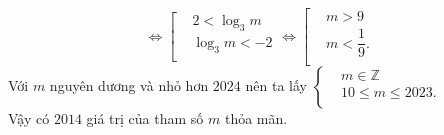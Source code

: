 \begin{ex}
{	$$\Leftrightarrow \left[\begin{aligned}
	& 2<\log_3m  \\
	 & \log_3m<-2 \\
	\end{aligned} \right. \Leftrightarrow
	\left[\begin{aligned}
	& m>9  \\
	 & m<\dfrac{1}{9}. \\
	\end{aligned} \right.$$
	Với  $m$ nguyên dương và nhỏ hơn $2024$ nên ta lấy
	$\left\{ \begin{aligned}
	& m\in \mathbb{Z} \\ 
	& 10\le m\le 2023.  \\
	\end{aligned} \right.$\\
	Vậy có $2014$ giá trị của tham  số $m$ thỏa mãn.
	} 
\end{ex}

